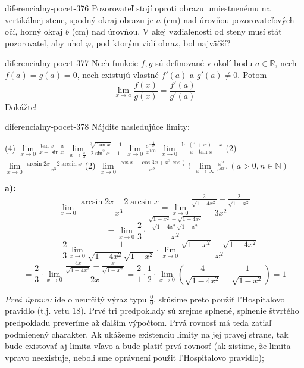 \begin{defproblem}{diferencialny-pocet-376}
Pozorovateľ stojí oproti obrazu umiestnenému na vertikálnej stene, spodný okraj
obrazu je $a$ (cm) nad úrovňou pozorovateľových očí, horný okraj $b$ (cm) nad
úrovňou. V akej vzdialenosti od steny musí stáť pozorovateľ, aby uhol $\varphi$,
pod ktorým vidí obraz, bol najväčší?
\end{defproblem}

\begin{defproblem}{diferencialny-pocet-377}
Nech funkcie $f,g$ sú definované v okolí bodu $a\in\mathbb{R}$, nech
$f(a)=g(a)=0$, nech existujú vlastné $f'(a)$ a $g'(a)\neq 0$. Potom
\[
  \lim_{x\rightarrow a}\frac{f(x)}{g(x)}=\frac{f'(a)}{g'(a)}
\]
Dokážte!
\end{defproblem}

\begin{defproblem}{diferencialny-pocet-378}
Nájdite nasledujúce limity:
\begin{tasks}(4)
  \task $\lim\limits_{x \rightarrow 0}\frac{\tan x-x}{x-\sin x}$
  \task $\lim\limits_{x \rightarrow \frac{\pi}{4}}\frac{\sqrt[3]{\tan x}-1}{2\sin^2 x -1}$
  \task $\lim\limits_{x \rightarrow 0}\frac{e^{-\frac{1}{x^2}}}{x^{100}}$
  \task $\lim\limits_{x \rightarrow 0}\frac{\ln (1+x)-x}{x\cdot\tan x}$
  \task*(2) $\lim\limits_{x \rightarrow 0}\frac{\arcsin 2x-2\arcsin x}{x^3}$
  \task*(2) $\lim\limits_{x \rightarrow 0}\frac{\cos x-\cos 3x+x^3\cos \frac{\pi}{x}}{x^2}$
  \task! $\lim\limits_{x \rightarrow \infty}\frac{x^n}{e^{ax}},(a>0,n\in\mathbb{N})$
\end{tasks}

\begin{solution}
  \textbf{a):}
  \[
    \lim_{x\rightarrow 0}\frac{\arcsin 2x-2\arcsin x}{x^3}
    = \lim_{x\rightarrow 0}
        \frac{
          \frac{2}{\sqrt{1-4x^2}}
          -
          \frac{2}{\sqrt{1-x^2}}}{3x^2}
  \]
  \[
  = \lim_{x \rightarrow 0}
      \frac{2}{3}
      \cdot
      \frac{\frac{\sqrt{1-x^2}-\sqrt{1-4x^2}}{\sqrt{1-4x^2}\sqrt{1-x^2}}}{x^2}
  \]
  \[
    = \frac{2}{3}
      \lim_{x\rightarrow 0}
        \frac{1}{\sqrt{1-4x^2}\sqrt{1-x^2}}
      \cdot
      \lim_{x\rightarrow 0}
        \frac{\sqrt{1-x^2}-\sqrt{1-4x^2}}{x^2}
  \]
  \[
    = \frac{2}{3}\cdot \lim_{x\rightarrow 0}\frac{\frac{4x}{\sqrt{1-4x^2}}-\frac{x}{\sqrt{1-x^2}}}{2x}
    = \frac{2}{1}\cdot\frac{1}{2}\cdot \lim_{x\rightarrow 0}(\frac{4}{\sqrt{1-4x^2}}-\frac{1}{\sqrt{1-x^2}})
    = 1
  \]

  \textit{Prvá úprava:}
  ide o neurčitý výraz typu $\frac{0}{0}$, skúsime preto použiť l'Hospitalovo
  pravidlo (t.j. vetu $18$). Prvé tri predpoklady sú zrejme splnené, splnenie
  štvrtého predpokladu preveríme až ďalším výpočtom. Prvá rovnosť má teda zatiaľ
  podmienený charakter. Ak ukážeme existenciu limity na jej pravej strane, tak
  bude existovať aj limita vľavo a bude platiť prvá rovnosť (ak zistíme, že
  limita vpravo neexistuje, neboli sme oprávnení použiť l'Hospitalovo pravidlo);


\end{solution}
\end{defproblem}
